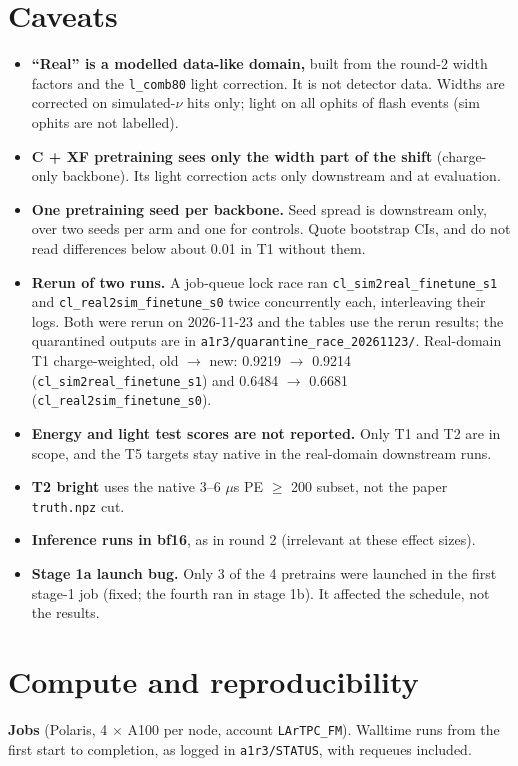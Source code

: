 \documentclass[10pt,a4paper]{article}
\begin{document}
\section{Caveats}
\begin{itemize}
\item \textbf{``Real'' is a modelled data-like domain,} built from the round-2 width factors and the \texttt{l\_\allowbreak{}comb80} light correction. It is not detector data. Widths are corrected on simulated-$\nu$ hits only; light on all ophits of flash events (sim ophits are not labelled).
\item \textbf{C + XF pretraining sees only the width part of the shift} (charge-only backbone). Its light correction acts only downstream and at evaluation.
\item \textbf{One pretraining seed per backbone.} Seed spread is downstream only, over two seeds per arm and one for controls. Quote bootstrap CIs, and do not read differences below about 0.01 in T1 without them.
\item \textbf{Rerun of two runs.} A job-queue lock race ran \texttt{cl\_\allowbreak{}sim2real\_\allowbreak{}finetune\_\allowbreak{}s1} and \texttt{cl\_\allowbreak{}real2sim\_\allowbreak{}finetune\_\allowbreak{}s0} twice concurrently each, interleaving their logs. Both were rerun on 2026-11-23 and the tables use the rerun results; the quarantined outputs are in \texttt{a1r3/\allowbreak{}quarantine\_\allowbreak{}race\_\allowbreak{}20261123/\allowbreak{}}. Real-domain T1 charge-weighted, old $\rightarrow$ new: 0.9219 $\rightarrow$ 0.9214 (\texttt{cl\_\allowbreak{}sim2real\_\allowbreak{}finetune\_\allowbreak{}s1}) and 0.6484 $\rightarrow$ 0.6681 (\texttt{cl\_\allowbreak{}real2sim\_\allowbreak{}finetune\_\allowbreak{}s0}).
\item \textbf{Energy and light test scores are not reported.} Only T1 and T2 are in scope, and the T5 targets stay native in the real-domain downstream runs.
\item \textbf{T2 bright} uses the native 3--6 $\mu$s PE $\geq$ 200 subset, not the paper \texttt{truth.npz} cut.
\item \textbf{Inference runs in bf16}, as in round 2 (irrelevant at these effect sizes).
\item \textbf{Stage 1a launch bug.} Only 3 of the 4 pretrains were launched in the first stage-1 job (fixed; the fourth ran in stage 1b). It affected the schedule, not the results.
\end{itemize}
\section{Compute and reproducibility}
\textbf{Jobs} (Polaris, 4 $\times$ A100 per node, account \texttt{LArTPC\_\allowbreak{}FM}). Walltime runs from the first start to completion, as logged in \texttt{a1r3/\allowbreak{}STATUS}, with requeues included.
\end{document}
